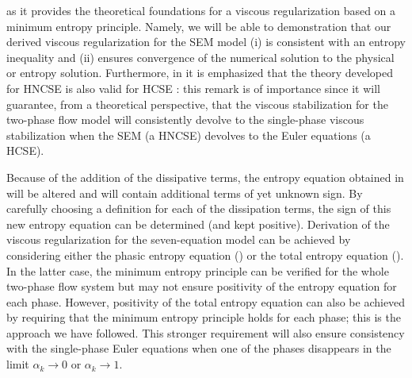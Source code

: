 as it provides the theoretical foundations for a viscous regularization based on a minimum entropy principle. Namely, 
we will be able to demonstration that our derived viscous regularization for the SEM model
(i) is consistent with an entropy inequality and (ii) ensures convergence of the numerical solution to the physical or entropy solution. 
Furthermore, in \cite{dlm,bianchini_bressan_2005,lefloch_1989} it is emphasized that the theory developed 
for HNCSE is also valid for HCSE : this remark is of importance since it will guarantee, from a 
theoretical perspective, that the viscous stabilization for the two-phase flow model will consistently devolve to the single-phase viscous stabilization
when the SEM (a HNCSE) devolves to the Euler equations (a HCSE). 

Because of the addition of the dissipative terms, the entropy equation obtained in 
will be altered and will contain additional terms of yet unknown sign. By carefully choosing 
a definition for each of the dissipation terms, the sign of this new entropy equation can be determined (and kept positive). Derivation of the viscous 
regularization for the seven-equation model can be achieved by considering either the phasic entropy equation () or the 
total entropy equation (). In the latter case, the minimum entropy principle can be verified for the whole two-phase flow system 
but may not ensure positivity of the entropy equation for each phase. However, positivity of the total entropy equation can also be achieved by requiring 
that the minimum entropy principle holds for each phase; this is the approach we have followed. This stronger requirement will also ensure consistency 
with the single-phase Euler equations when one of the phases disappears in the limit $\alpha_k \to 0$ or $\alpha_k \to 1$. 
%
